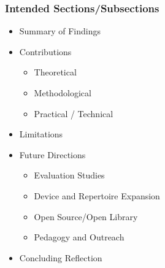 \subsubsection{Intended Sections/Subsections}
\begin{itemize}[nosep]
	\item Summary of Findings
	\item Contributions
		\begin{itemize}[nosep]
			\item Theoretical
			\item Methodological
			\item Practical / Technical
		\end{itemize}
	\item Limitations
	\item Future Directions
		\begin{itemize}[nosep]
			\item Evaluation Studies
			\item Device and Repertoire Expansion
			\item Open Source/Open Library
			\item Pedagogy and Outreach
		\end{itemize}
	\item Concluding Reflection
\end{itemize}


